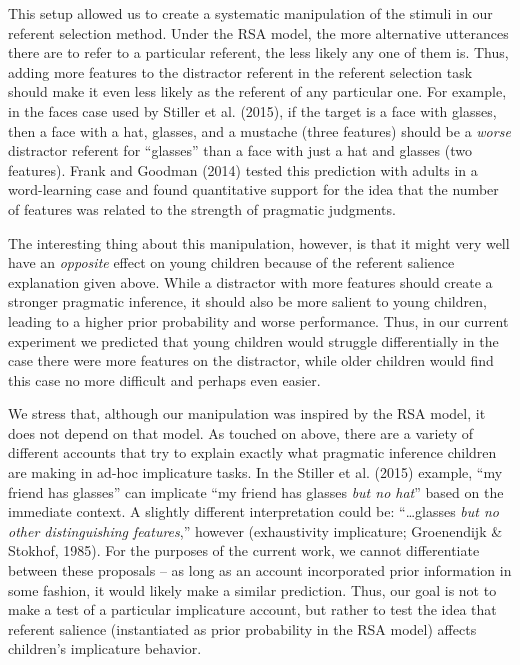 \documentclass[mask,man]{apa6}
\begin{document}
This setup allowed us to create a systematic manipulation of the stimuli
in our referent selection method. Under the RSA model, the more
alternative utterances there are to refer to a particular referent, the
less likely any one of them is. Thus, adding more features to the
distractor referent in the referent selection task should make it even
less likely as the referent of any particular one. For example, in the
faces case used by Stiller et al. (2015), if the target is a face with
glasses, then a face with a hat, glasses, and a mustache (three
features) should be a \emph{worse} distractor referent for
\enquote{glasses} than a face with just a hat and glasses (two
features). Frank and Goodman (2014) tested this prediction with adults
in a word-learning case and found quantitative support for the idea that
the number of features was related to the strength of pragmatic
judgments.

The interesting thing about this manipulation, however, is that it might
very well have an \emph{opposite} effect on young children because of
the referent salience explanation given above. While a distractor with
more features should create a stronger pragmatic inference, it should
also be more salient to young children, leading to a higher prior
probability and worse performance. Thus, in our current experiment we
predicted that young children would struggle differentially in the case
there were more features on the distractor, while older children would
find this case no more difficult and perhaps even easier.

We stress that, although our manipulation was inspired by the RSA model,
it does not depend on that model. As touched on above, there are a
variety of different accounts that try to explain exactly what pragmatic
inference children are making in ad-hoc implicature tasks. In the
Stiller et al. (2015) example, \enquote{my friend has glasses} can
implicate \enquote{my friend has glasses \emph{but no hat}} based on the
immediate context. A slightly different interpretation could be:
\enquote{\ldots{}glasses \emph{but no other distinguishing features},}
however (exhaustivity implicature; Groenendijk \& Stokhof, 1985). For
the purposes of the current work, we cannot differentiate between these
proposals -- as long as an account incorporated prior information in
some fashion, it would likely make a similar prediction. Thus, our goal
is not to make a test of a particular implicature account, but rather to
test the idea that referent salience (instantiated as prior probability
in the RSA model) affects children's implicature behavior.
\end{document}

